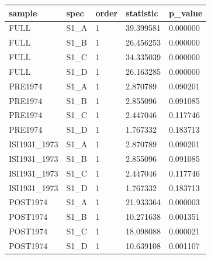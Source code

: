 \begin{tabular}{lllll}
\hline
sample & spec & order & statistic & p\_value \\
\hline
FULL & S1\_A & 1 & 39.399581 & 0.000000 \\
FULL & S1\_B & 1 & 26.456253 & 0.000000 \\
FULL & S1\_C & 1 & 34.335039 & 0.000000 \\
FULL & S1\_D & 1 & 26.163285 & 0.000000 \\
PRE1974 & S1\_A & 1 & 2.870789 & 0.090201 \\
PRE1974 & S1\_B & 1 & 2.855096 & 0.091085 \\
PRE1974 & S1\_C & 1 & 2.447046 & 0.117746 \\
PRE1974 & S1\_D & 1 & 1.767332 & 0.183713 \\
ISI1931\_1973 & S1\_A & 1 & 2.870789 & 0.090201 \\
ISI1931\_1973 & S1\_B & 1 & 2.855096 & 0.091085 \\
ISI1931\_1973 & S1\_C & 1 & 2.447046 & 0.117746 \\
ISI1931\_1973 & S1\_D & 1 & 1.767332 & 0.183713 \\
POST1974 & S1\_A & 1 & 21.933364 & 0.000003 \\
POST1974 & S1\_B & 1 & 10.271638 & 0.001351 \\
POST1974 & S1\_C & 1 & 18.098088 & 0.000021 \\
POST1974 & S1\_D & 1 & 10.639108 & 0.001107 \\
\hline
\end{tabular}
